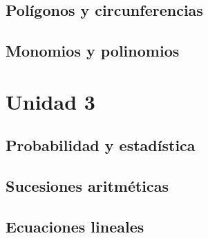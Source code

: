 \documentclass[repaso]{RDS_unit}
\begin{document}
\begin{questions}


 \subsection{Polígonos y circunferencias}
   



 \subsection{Monomios y polinomios}
   

	\section{Unidad 3}

    \subsection{Probabilidad y estadística}
	


   
% 

\subsection{Sucesiones aritméticas}




\newpage
\subsection{Ecuaciones lineales}



  \end{questions}
\end{document}
